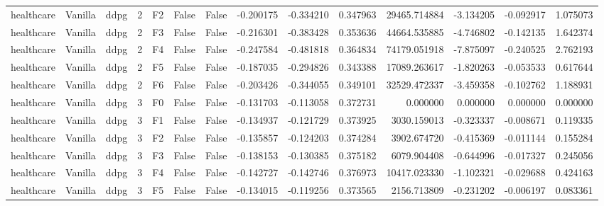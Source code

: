 \begin{tabular}{lllrlllrrrrrrr}
healthcare & Vanilla &      ddpg &     2 &  F2 &           False &            False & -0.200175 & -0.334210 & 0.347963 &     29465.714884 &          -3.134205 &       -0.092917 &            1.075073 \\
healthcare & Vanilla &      ddpg &     2 &  F3 &           False &            False & -0.216301 & -0.383428 & 0.353636 &     44664.535885 &          -4.746802 &       -0.142135 &            1.642374 \\
healthcare & Vanilla &      ddpg &     2 &  F4 &           False &            False & -0.247584 & -0.481818 & 0.364834 &     74179.051918 &          -7.875097 &       -0.240525 &            2.762193 \\
healthcare & Vanilla &      ddpg &     2 &  F5 &           False &            False & -0.187035 & -0.294826 & 0.343388 &     17089.263617 &          -1.820263 &       -0.053533 &            0.617644 \\
healthcare & Vanilla &      ddpg &     2 &  F6 &           False &            False & -0.203426 & -0.344055 & 0.349101 &     32529.472337 &          -3.459358 &       -0.102762 &            1.188931 \\
healthcare & Vanilla &      ddpg &     3 &  F0 &           False &            False & -0.131703 & -0.113058 & 0.372731 &         0.000000 &           0.000000 &        0.000000 &            0.000000 \\
healthcare & Vanilla &      ddpg &     3 &  F1 &           False &            False & -0.134937 & -0.121729 & 0.373925 &      3030.159013 &          -0.323337 &       -0.008671 &            0.119335 \\
healthcare & Vanilla &      ddpg &     3 &  F2 &           False &            False & -0.135857 & -0.124203 & 0.374284 &      3902.674720 &          -0.415369 &       -0.011144 &            0.155284 \\
healthcare & Vanilla &      ddpg &     3 &  F3 &           False &            False & -0.138153 & -0.130385 & 0.375182 &      6079.904408 &          -0.644996 &       -0.017327 &            0.245056 \\
healthcare & Vanilla &      ddpg &     3 &  F4 &           False &            False & -0.142727 & -0.142746 & 0.376973 &     10417.023330 &          -1.102321 &       -0.029688 &            0.424163 \\
healthcare & Vanilla &      ddpg &     3 &  F5 &           False &            False & -0.134015 & -0.119256 & 0.373565 &      2156.713809 &          -0.231202 &       -0.006197 &            0.083361 \\

\end{tabular}
